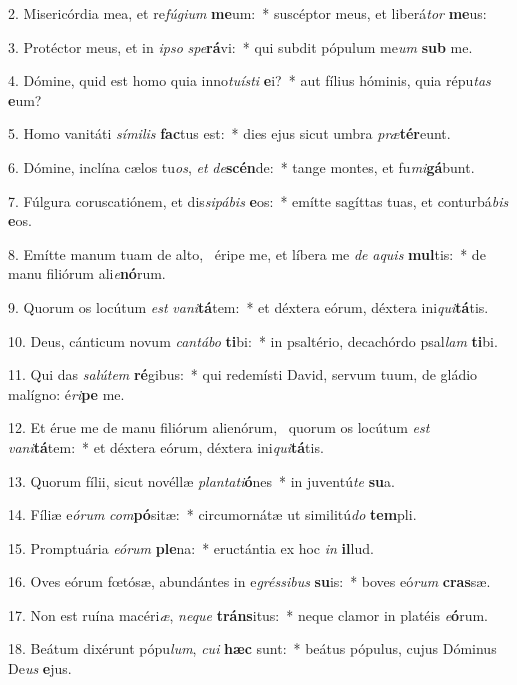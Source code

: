 2. Misericórdia mea, et re\textit{fú}\textit{gi}\textit{um} \textbf{me}um:~*  suscéptor meus, et liberá\textit{tor} \textbf{me}us:\

3. Protéctor meus, et in \textit{ip}\textit{so} \textit{spe}\textbf{rá}vi:~*  qui subdit pópulum me\textit{um} \textbf{sub} me.\

4. Dómine, quid est homo quia inno\textit{tu}\textit{ís}\textit{ti} \textbf{e}i?~*  aut fílius hóminis, quia répu\textit{tas} \textbf{e}um?\

5. Homo vanitáti \textit{sí}\textit{mi}\textit{lis} \textbf{fac}tus est:~*  dies ejus sicut umbra \textit{præ}\textbf{tér}eunt.\

6. Dómine, inclína cælos tu\textit{os}, \textit{et} \textit{de}\textbf{scén}de:~*  tange montes, et fu\textit{mi}\textbf{gá}bunt.\

7. Fúlgura coruscatiónem, et dis\textit{si}\textit{pá}\textit{bis} \textbf{e}os:~*  emítte sagíttas tuas, et conturbá\textit{bis} \textbf{e}os.\

8. Emítte manum tuam de alto, \dag\  éripe me, et líbera me \textit{de} \textit{a}\textit{quis} \textbf{mul}tis:~*  de manu filiórum ali\textit{e}\textbf{nó}rum.\

9. Quorum os locútum \textit{est} \textit{va}\textit{ni}\textbf{tá}tem:~*  et déxtera eórum, déxtera ini\textit{qui}\textbf{tá}tis.\

10. Deus, cánticum novum \textit{can}\textit{tá}\textit{bo} \textbf{ti}bi:~*  in psaltério, decachórdo psal\textit{lam} \textbf{ti}bi.\

11. Qui das \textit{sa}\textit{lú}\textit{tem} \textbf{ré}gibus:~*  qui redemísti David, servum tuum, de gládio malígno: é\textit{ri}\textbf{pe} me.\

12. Et érue me de manu filiórum alienórum, \dag\  quorum os locútum \textit{est} \textit{va}\textit{ni}\textbf{tá}tem:~*  et déxtera eórum, déxtera ini\textit{qui}\textbf{tá}tis.\

13. Quorum fílii, sicut novéllæ \textit{plan}\textit{ta}\textit{ti}\textbf{ó}nes~*  in juventú\textit{te} \textbf{su}a.\

14. Fíliæ e\textit{ó}\textit{rum} \textit{com}\textbf{pó}sitæ:~*  circumornátæ ut similitú\textit{do} \textbf{tem}pli.\

15. Promptuária \textit{e}\textit{ó}\textit{rum} \textbf{ple}na:~*  eructántia ex hoc \textit{in} \textbf{il}lud.\

16. Oves eórum fœtósæ, abundántes in e\textit{grés}\textit{si}\textit{bus} \textbf{su}is:~*  boves eó\textit{rum} \textbf{cras}sæ.\

17. Non est ruína macéri\textit{æ}, \textit{ne}\textit{que} \textbf{tráns}itus:~*  neque clamor in platéis \textit{e}\textbf{ó}rum.\

18. Beátum dixérunt pópu\textit{lum}, \textit{cu}\textit{i} \textbf{hæc} sunt:~*  beátus pópulus, cujus Dóminus De\textit{us} \textbf{e}jus.\

